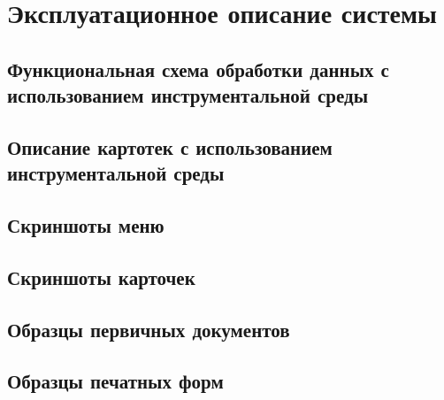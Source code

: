 \section{Эксплуатационное описание системы}
\subsection{Функциональная схема обработки данных с использованием инструментальной среды}
\subsection{Описание картотек с использованием инструментальной среды}
\subsection{Скриншоты меню}
\subsection{Скриншоты карточек}
\subsection{Образцы первичных документов}
\subsection{Образцы печатных форм}
